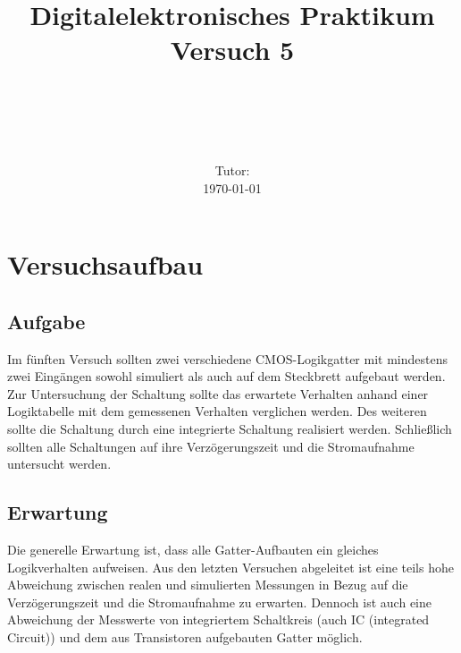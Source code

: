 \documentclass[11pt, a4paper]{article}
\title{\textbf{Digitalelektronisches Praktikum\\ Versuch 5}}
\author{\ATutantName \\ \emph{\ATutantEmail} \and \BTutantName\\ \emph{\BTutantEmail}}
\date{\Gruppennummer \\[3ex] Tutor: \Tutorname \\[3ex] \today}
\begin{document}
\clearpage
\maketitle
\thispagestyle{empty}
\newpage


\section*{Versuchsaufbau}
\subsection*{Aufgabe}
Im fünften Versuch sollten zwei verschiedene CMOS-Logikgatter mit mindestens zwei Eingängen sowohl simuliert als auch auf dem Steckbrett aufgebaut werden. Zur Untersuchung der Schaltung sollte das erwartete Verhalten anhand einer Logiktabelle mit dem gemessenen Verhalten verglichen werden. Des weiteren sollte die Schaltung durch eine integrierte Schaltung realisiert werden. Schließlich sollten alle Schaltungen auf ihre Verzögerungszeit und die Stromaufnahme untersucht werden.
\subsection*{Erwartung}
Die generelle Erwartung ist, dass alle Gatter-Aufbauten ein gleiches Logikverhalten aufweisen. Aus den letzten Versuchen abgeleitet ist eine teils hohe Abweichung zwischen realen und simulierten Messungen in Bezug auf die Verzögerungszeit und die Stromaufnahme zu erwarten. Dennoch ist auch eine Abweichung der Messwerte von integriertem Schaltkreis (auch IC (integrated Circuit)) und dem aus Transistoren aufgebauten Gatter möglich.

\end{document}
